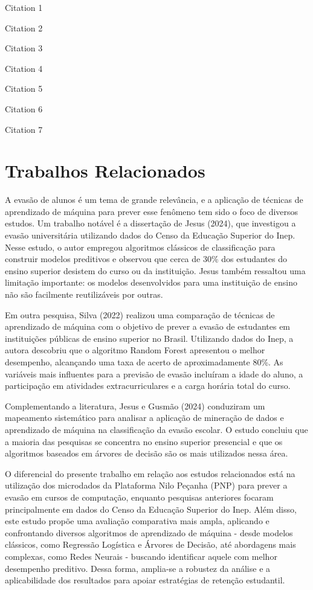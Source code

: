 \documentclass[english, spanish, brazilian]{RBIEarticle} %
\begin{document}
    Citation 1 \parencite{Baker2011}
    
    Citation 2 \parencite{Seffrin2013}
    
    Citation 3 \parencite{Brasil2008}
    
    Citation 4 \parencite{Kautzman2015}
    
    Citation 5 \parencite{Sweller1991}
    
    Citation 6 \parencite{Clark2006}
    
    Citation 7 \parencite{Mason2012}
\fi %

\section{Trabalhos Relacionados}
A evasão de alunos é um tema de grande relevância, e a aplicação de técnicas de aprendizado de máquina para prever esse fenômeno tem sido o foco de diversos estudos. Um trabalho notável é a dissertação de Jesus (2024), que investigou a evasão universitária utilizando dados do Censo da Educação Superior do Inep. Nesse estudo, o autor empregou algoritmos clássicos de classificação para construir modelos preditivos e observou que cerca de 30\% dos estudantes do ensino superior desistem do curso ou da instituição. Jesus também ressaltou uma limitação importante: os modelos desenvolvidos para uma instituição de ensino não são facilmente reutilizáveis por outras.

Em outra pesquisa, Silva (2022) realizou uma comparação de técnicas de aprendizado de máquina com o objetivo de prever a evasão de estudantes em instituições públicas de ensino superior no Brasil. Utilizando dados do Inep, a autora descobriu que o algoritmo Random Forest apresentou o melhor desempenho, alcançando uma taxa de acerto de aproximadamente 80\%. As variáveis mais influentes para a previsão de evasão incluíram a idade do aluno, a participação em atividades extracurriculares e a carga horária total do curso.

Complementando a literatura, Jesus e Gusmão (2024) conduziram um mapeamento sistemático para analisar a aplicação de mineração de dados e aprendizado de máquina na classificação da evasão escolar. O estudo concluiu que a maioria das pesquisas se concentra no ensino superior presencial e que os algoritmos baseados em árvores de decisão são os mais utilizados nessa área.

O diferencial do presente trabalho em relação aos estudos relacionados está na utilização dos microdados da Plataforma Nilo Peçanha (PNP) para prever a evasão em cursos de computação, enquanto pesquisas anteriores focaram principalmente em dados do Censo da Educação Superior do Inep. Além disso, este estudo propõe uma avaliação comparativa mais ampla, aplicando e confrontando diversos algoritmos de aprendizado de máquina - desde modelos clássicos, como Regressão Logística e Árvores de Decisão, até abordagens mais complexas, como Redes Neurais - buscando identificar aquele com melhor desempenho preditivo. Dessa forma, amplia-se a robustez da análise e a aplicabilidade dos resultados para apoiar estratégias de retenção estudantil.
\end{document}
